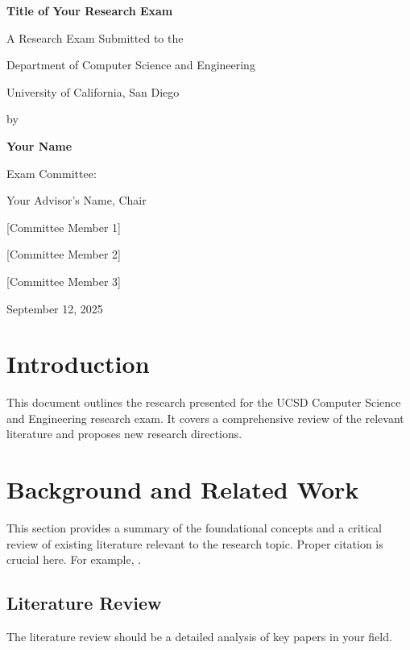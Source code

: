 \documentclass[12pt]{article}
\newcommand{\myname}{Your Name}
\newcommand{\myadvisor}{Your Advisor's Name}
\newcommand{\examdate}{September 12, 2025}
\newcommand{\examtitle}{Title of Your Research Exam}
\begin{document}
\begin{titlepage}
    \centering
    {\Large\bfseries \examtitle\par}
    \vspace{1.5cm}
    {\large A Research Exam Submitted to the\par}
    {\large Department of Computer Science and Engineering\par}
    {\large University of California, San Diego\par}
    \vspace{2cm}
    {\large by\par}
    \vspace{0.5cm}
    {\Large\bfseries \myname\par}
    \vspace{2cm}
    {\large Exam Committee:\par}
    {\large\myadvisor, Chair\par}
    {\large [Committee Member 1]\par}
    {\large [Committee Member 2]\par}
    {\large [Committee Member 3]\par}
    \vfill
    {\large \examdate\par}
\end{titlepage}

\tableofcontents
\newpage

\section{Introduction}
\label{sec:introduction}
This document outlines the research presented for the UCSD Computer Science and Engineering research exam. It covers a comprehensive review of the relevant literature and proposes new research directions.

\section{Background and Related Work}
\label{sec:related-work}
This section provides a summary of the foundational concepts and a critical review of existing literature relevant to the research topic. Proper citation is crucial here. For example, \cite{citation1, citation2}.

\subsection{Literature Review}
The literature review should be a detailed analysis of key papers in your field.
\end{document}
